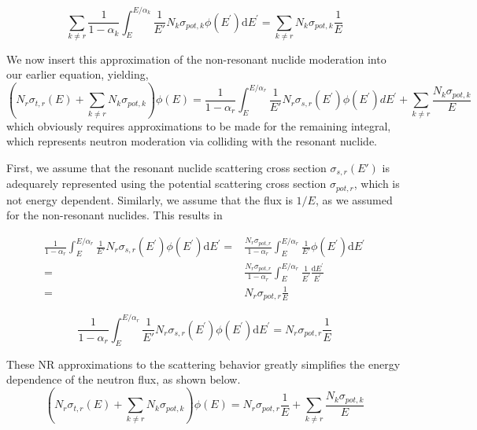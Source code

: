 \documentclass[10pt]{article}
\begin{document}
\begin{equation}\boxed{\sum\limits_{k\neq r}\frac{1}{1-\alpha_{k}}\int_{E}^{E/\alpha_{k}}\frac{1}{E'}N_{k}\sigma_{pot,k}\phi\left(E^{\prime}\right)\mathrm{d}E^{\prime}=\sum\limits_{k\neq r}N_{k}\sigma_{pot,k}\frac{1}{E}}\label{eq:NR-mainConclusion1}\end{equation}

We now insert this approximation of the non-resonant nuclide moderation into our earlier equation, yielding,
\begin{equation}\left(N_{r}\sigma_{t,r}(E)+\sum\limits_{k\neq r}N_{k}\sigma_{pot,k}\right)\phi(E) = \frac{1}{1-\alpha_{r}}\int_{E}^{E/\alpha_{r}}\frac{1}{E'}N_{r}\sigma_{s,r}\left(E^{\prime}\right)\phi\left(E^{\prime}\right)dE^{\prime} + \sum\limits_{k\neq r}\frac{N_{k}\sigma_{pot,k}}{E}\end{equation}
which obviously requires approximations to be made for the remaining integral, which represents neutron moderation via colliding with the resonant nuclide.\par
First, we assume that the resonant nuclide scattering cross section $\sigma_{s,r}(E')$ is adequarely represented using the potential scattering cross section $\sigma_{pot,r}$, which is not energy dependent. Similarly, we assume that the flux is $1/E$, as we assumed for the non-resonant nuclides. This results in

\begin{align}\frac{1}{1-\alpha_{r}}\int_{E}^{E/\alpha_{r}}\frac{1}{E'}N_{r}\sigma_{s,r}\left(E^{\prime}\right)\phi\left(E^{\prime}\right)\mathrm{d}E^{\prime} = &\frac{N_{r}\sigma_{pot,r}}{1-\alpha_{r}}\int_{E}^{E/\alpha_{r}}\frac{1}{E'}\phi\left(E^{\prime}\right)\mathrm{d}E^{\prime} 
  \\
  =&\frac{N_{r}\sigma_{pot,r}}{1-\alpha_{r}}\int_{E}^{E/\alpha_{r}}\frac{1}{E^{\prime}}\frac{\mathrm{d}E^{\prime}}{E^{\prime}}
  \\
  =&N_{r}\sigma_{pot,r}\frac{1}{E}
\end{align}

\begin{equation}\boxed{\frac{1}{1-\alpha_{r}}\int_{E}^{E/\alpha_{r}}\frac{1}{E'}N_{r}\sigma_{s,r}\left(E^{\prime}\right)\phi\left(E^{\prime}\right)\mathrm{d}E^{\prime}=N_{r}\sigma_{pot,r}\frac{1}{E}}\label{eq:NR-mainConclusion2}\end{equation}

These NR approximations to the scattering behavior greatly simplifies the energy dependence of the neutron flux, as shown below.
\begin{equation}\left(N_{r}\sigma_{t,r}(E)+\sum\limits_{k\neq r}N_{k}\sigma_{pot,k}\right)\phi(E) = N_{r}\sigma_{pot,r}\frac{1}{E} + \sum\limits_{k\neq r}\frac{N_{k}\sigma_{pot,k}}{E}\end{equation}
\end{document}
